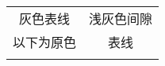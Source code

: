 \documentclass[nofonts]{ctexart}
\begin{document}
\begin{tabular}{|c|c|}
	\hline\hline
	灰色表线	& 浅灰色间隙	\\
	\arrayrulecolor{black}
	\hline
	以下为原色	& 表线			\\
	\doublerulesepcolor{white}
	\hline\hline
\end{tabular}
\end{document}
